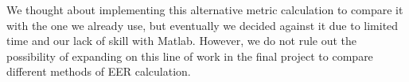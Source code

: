 \documentclass[11pt]{article}
\begin{document}
We thought about implementing this alternative metric calculation to compare it with the one we already use, but eventually we decided against it due to limited time and our lack of skill with Matlab. However, we do not rule out the possibility of expanding on this line of work in the final project to compare different methods of EER calculation.
\end{document}
